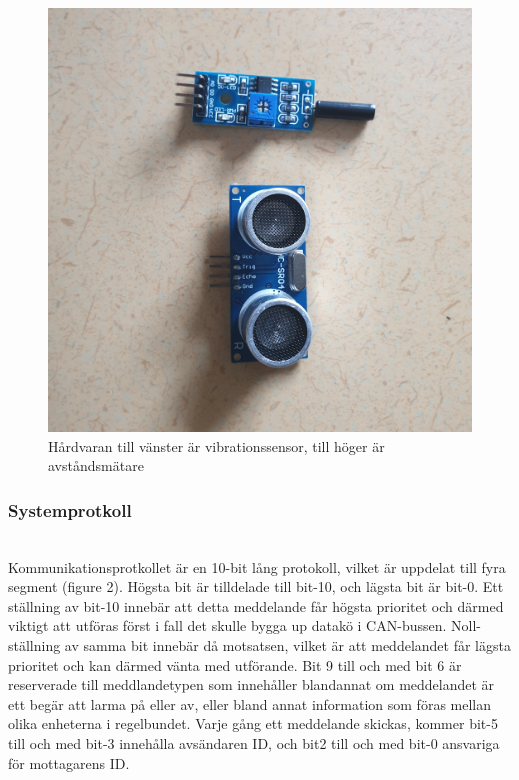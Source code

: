 \documentclass{article}
\begin{document}
\begin{figure}[h]
    \centering
    \includegraphics[scale=0.05]{Projektrapport/sensor.png}
    \caption {Hårdvaran till vänster är vibrationssensor, till höger är avståndsmätare}
    \label{fig:drawing}
\end{figure}
\subsubsection{Systemprotkoll}\\
Kommunikationsprotkollet är en 10-bit lång protokoll, vilket är uppdelat till fyra segment (figure 2). Högsta bit är tilldelade till bit-10, och lägsta bit är bit-0. Ett ställning av bit-10 innebär att detta meddelande får högsta prioritet och därmed viktigt att utföras först i fall det skulle bygga up datakö i CAN-bussen. Noll-ställning av samma bit innebär då motsatsen, vilket är att meddelandet får lägsta prioritet och kan därmed vänta med utförande. Bit 9 till och med bit 6 är reserverade till meddlandetypen som innehåller blandannat om meddelandet är ett begär att larma på eller av, eller bland annat information som föras mellan olika enheterna i regelbundet. Varje gång ett meddelande skickas, kommer bit-5 till och med bit-3 innehålla avsändaren ID, och bit2 till och med bit-0 ansvariga för mottagarens ID. 
\end{document}
